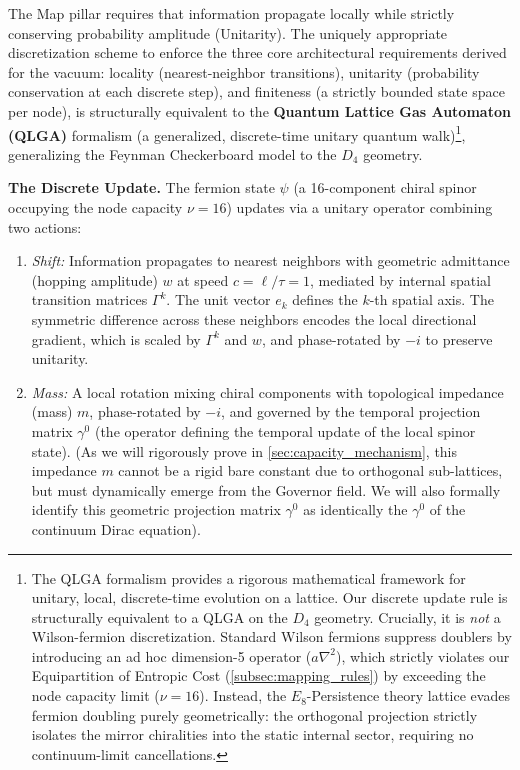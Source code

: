 The Map pillar requires that information propagate locally while strictly conserving probability amplitude (Unitarity). The uniquely appropriate discretization scheme to enforce the three core architectural requirements derived for the vacuum: locality (nearest-neighbor transitions), unitarity (probability conservation at each discrete step), and finiteness (a strictly bounded state space per node), is structurally equivalent to the \textbf{Quantum Lattice Gas Automaton (QLGA)} formalism (a generalized, discrete-time unitary quantum walk)\cite{meyer_quantum_1996}\footnote{The QLGA formalism provides a rigorous mathematical framework for unitary, local, discrete-time evolution on a lattice. Our discrete update rule is structurally equivalent to a QLGA on the $D_4$ geometry. Crucially, it is \emph{not} a Wilson-fermion discretization. Standard Wilson fermions suppress doublers by introducing an ad hoc dimension-5 operator ($a \nabla^2$), which strictly violates our Equipartition of Entropic Cost (\cref{subsec:mapping_rules}) by exceeding the node capacity limit ($\nu=16$). Instead, the $E_8$-Persistence theory lattice evades fermion doubling purely geometrically: the orthogonal projection strictly isolates the mirror chiralities into the static internal sector, requiring no continuum-limit cancellations.}, generalizing the Feynman Checkerboard model\cite{feynman_quantum_1965} to the $D_4$ geometry.

\textbf{The Discrete Update.} The fermion state $\psi$ (a 16-component chiral spinor occupying the node capacity $\nu=16$) updates via a unitary operator combining two actions:

\begin{enumerate}
    \item \textit{Shift:} Information propagates to nearest neighbors with geometric admittance (hopping amplitude) $w$ at speed $c = \ell/\tau = 1$, mediated by internal spatial transition matrices $\Gamma^k$. The unit vector $e_k$ defines the $k$-th spatial axis. The symmetric difference across these neighbors encodes the local directional gradient, which is scaled by $\Gamma^k$ and $w$, and phase-rotated by $-i$ to preserve unitarity.

    \item \textit{Mass:} A local rotation mixing chiral components with topological impedance (mass) $m$, phase-rotated by $-i$, and governed by the temporal projection matrix $\gamma^0$ (the operator defining the temporal update of the local spinor state). (As we will rigorously prove in \cref{sec:capacity_mechanism}, this impedance $m$ cannot be a rigid bare constant due to orthogonal sub-lattices, but must dynamically emerge from the Governor field. We will also formally identify this geometric projection matrix $\gamma^0$ as identically the $\gamma^0$ of the continuum Dirac equation).
\end{enumerate}

